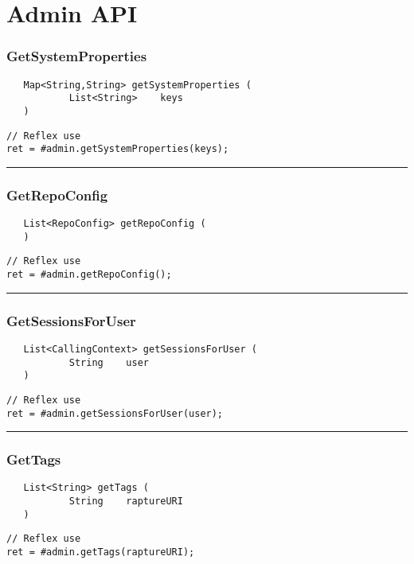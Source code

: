 \section{Admin API}

\subsubsection{GetSystemProperties}
\label{Api:GetSystemProperties}
\begin{verbatim}
   Map<String,String> getSystemProperties (
           List<String>    keys
   )
\end{verbatim}
\begin{lstlisting}[language=reflex]
// Reflex use
ret = #admin.getSystemProperties(keys);
\end{lstlisting}



\rule{15cm}{2pt}
\subsubsection{GetRepoConfig}
\label{Api:GetRepoConfig}
\begin{verbatim}
   List<RepoConfig> getRepoConfig (
   )
\end{verbatim}
\begin{lstlisting}[language=reflex]
// Reflex use
ret = #admin.getRepoConfig();
\end{lstlisting}



\rule{15cm}{2pt}
\subsubsection{GetSessionsForUser}
\label{Api:GetSessionsForUser}
\begin{verbatim}
   List<CallingContext> getSessionsForUser (
           String    user
   )
\end{verbatim}
\begin{lstlisting}[language=reflex]
// Reflex use
ret = #admin.getSessionsForUser(user);
\end{lstlisting}



\rule{15cm}{2pt}
\subsubsection{GetTags}
\label{Api:GetTags}
\begin{verbatim}
   List<String> getTags (
           String    raptureURI
   )
\end{verbatim}
\begin{lstlisting}[language=reflex]
// Reflex use
ret = #admin.getTags(raptureURI);
\end{lstlisting}



